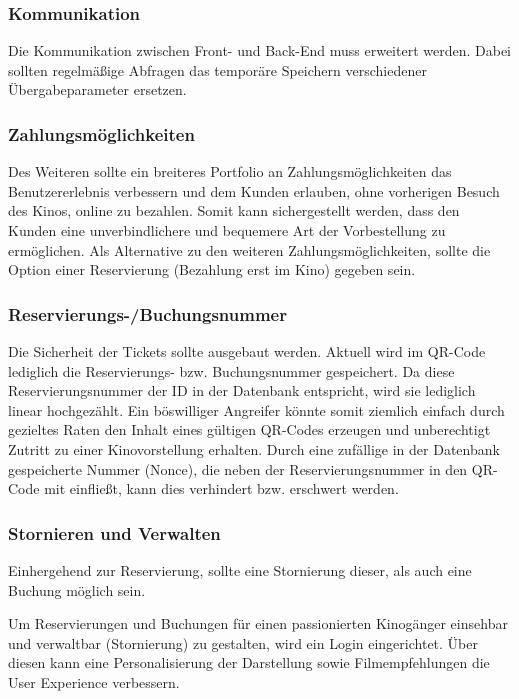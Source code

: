\subsubsection*{Kommunikation}
\label{ssssec:kommunikation}
Die Kommunikation zwischen Front- und Back-End muss erweitert werden.
Dabei sollten regelmäßige Abfragen das temporäre Speichern verschiedener Übergabeparameter ersetzen.

\subsubsection*{Zahlungsmöglichkeiten}
\label{ssssec:zahlungsmöglichkeiten}
Des Weiteren sollte ein breiteres Portfolio an Zahlungsmöglichkeiten das Benutzererlebnis verbessern und dem Kunden erlauben, ohne vorherigen Besuch des Kinos, online zu bezahlen.
Somit kann sichergestellt werden, dass den Kunden eine unverbindlichere und bequemere Art der Vorbestellung zu ermöglichen.
Als Alternative zu den weiteren Zahlungsmöglichkeiten, sollte die Option einer Reservierung (Bezahlung erst im Kino) gegeben sein.

\subsubsection*{Reservierungs-/Buchungsnummer}
\label{ssssec:reservierungsnummer}
Die Sicherheit der Tickets sollte ausgebaut werden.
Aktuell wird im \acs{QR-Code} lediglich die Reservierungs- bzw. Buchungsnummer gespeichert.
Da diese Reservierungsnummer der ID in der Datenbank entspricht, wird sie lediglich linear hochgezählt.
Ein böswilliger Angreifer könnte somit ziemlich einfach durch gezieltes Raten den Inhalt eines gültigen \acs{QR-Code}s erzeugen und unberechtigt Zutritt zu einer Kinovorstellung erhalten.
Durch eine zufällige in der Datenbank gespeicherte Nummer (Nonce), die neben der Reservierungsnummer in den \acs{QR-Code} mit einfließt, kann dies verhindert bzw. erschwert werden.

\subsubsection*{Stornieren und Verwalten}
\label{ssssec:stornieren_und_verwalten}
Einhergehend zur Reservierung, sollte eine Stornierung dieser, als auch eine Buchung möglich sein.

Um Reservierungen und Buchungen für einen passionierten Kinogänger einsehbar und verwaltbar (\ua Stornierung) zu gestalten, wird ein Login eingerichtet.
Über diesen kann eine Personalisierung der Darstellung sowie Filmempfehlungen die User Experience verbessern.
